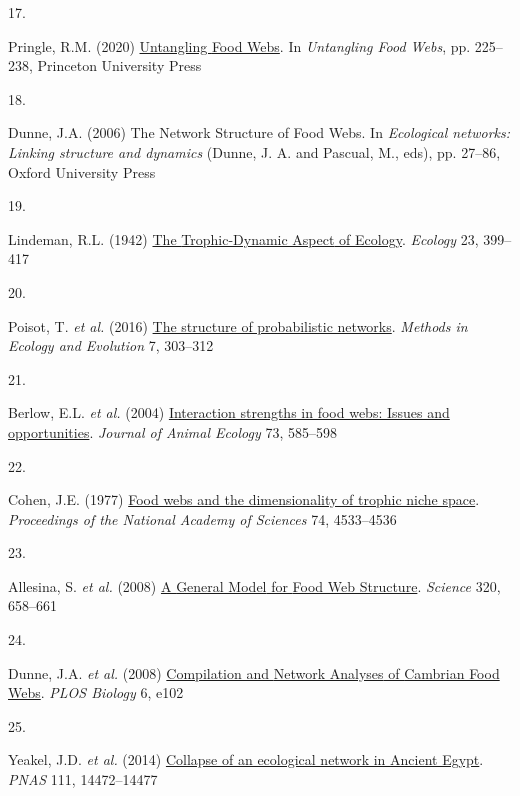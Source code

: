 \documentclass[
]{article}
\newlength{\cslhangindent}
\newlength{\csllabelwidth}
\newenvironment{CSLReferences}[2] %
 {\begin{list}{}{%
  \setlength{\itemindent}{0pt}
  \setlength{\leftmargin}{0pt}
  \setlength{\parsep}{0pt}
  \ifodd #1
   \setlength{\leftmargin}{\cslhangindent}
   \setlength{\itemindent}{-1\cslhangindent}
  \fi
  \setlength{\itemsep}{#2\baselineskip}}}
 {\end{list}}
\newcommand{\CSLLeftMargin}[1]{\parbox[t]{\csllabelwidth}{\strut#1\strut}}
\newcommand{\CSLRightInline}[1]{\parbox[t]{\linewidth - \csllabelwidth}{\strut#1\strut}}
\begin{document}
\begin{CSLReferences}{0}{0}
\CSLLeftMargin{17. }%
\CSLRightInline{Pringle, R.M. (2020)
\href{https://doi.org/10.1515/9780691195322-020}{Untangling {Food
Webs}}. In \emph{Untangling {Food Webs}}, pp. 225--238, Princeton
University Press}

\CSLLeftMargin{18. }%
\CSLRightInline{Dunne, J.A. (2006) The {Network Structure} of {Food
Webs}. In \emph{Ecological networks: {Linking} structure and dynamics}
(Dunne, J. A. and Pascual, M., eds), pp. 27--86, Oxford University
Press}

\CSLLeftMargin{19. }%
\CSLRightInline{Lindeman, R.L. (1942)
\href{https://doi.org/10.2307/1930126}{The {Trophic-Dynamic Aspect} of
{Ecology}}. \emph{Ecology} 23, 399--417}

\CSLLeftMargin{20. }%
\CSLRightInline{Poisot, T. \emph{et al.} (2016)
\href{https://doi.org/10}{The structure of probabilistic networks}.
\emph{Methods in Ecology and Evolution} 7, 303--312}

\CSLLeftMargin{21. }%
\CSLRightInline{Berlow, E.L. \emph{et al.} (2004)
\href{https://doi.org/10.1111/j.0021-8790.2004.00833.x}{Interaction
strengths in food webs: Issues and opportunities}. \emph{Journal of
Animal Ecology} 73, 585--598}

\CSLLeftMargin{22. }%
\CSLRightInline{Cohen, J.E. (1977)
\href{https://doi.org/10.1073/pnas.74.10.4533}{Food webs and the
dimensionality of trophic niche space}. \emph{Proceedings of the
National Academy of Sciences} 74, 4533--4536}

\CSLLeftMargin{23. }%
\CSLRightInline{Allesina, S. \emph{et al.} (2008)
\href{https://doi.org/10.1126/science.1156269}{A {General Model} for
{Food Web Structure}}. \emph{Science} 320, 658--661}

\CSLLeftMargin{24. }%
\CSLRightInline{Dunne, J.A. \emph{et al.} (2008)
\href{https://doi.org/10.1371/journal.pbio.0060102}{Compilation and
{Network Analyses} of {Cambrian Food Webs}}. \emph{PLOS Biology} 6,
e102}

\CSLLeftMargin{25. }%
\CSLRightInline{Yeakel, J.D. \emph{et al.} (2014)
\href{https://doi.org/10.1073/pnas.1408471111}{Collapse of an ecological
network in {Ancient Egypt}}. \emph{PNAS} 111, 14472--14477}


\end{CSLReferences}
\end{document}
